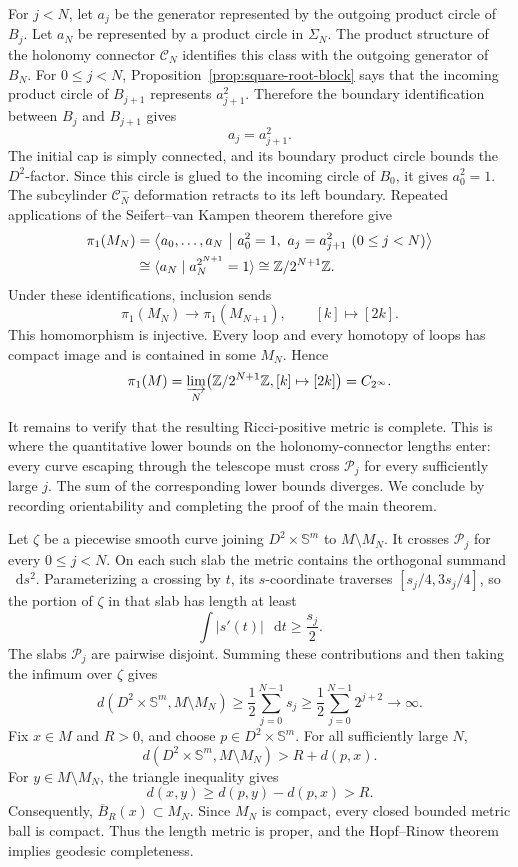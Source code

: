 \documentclass[11pt,reqno]{amsart}
\theoremstyle{definition}
\numberwithin{equation}{section}
\newcommand{\dd}{\mathop{}\!\mathrm d}
\newcommand{\CPrufer}{C_{2^\infty}}
\begin{document}
For \(j<N\), let \(a_j\) be the generator represented by the outgoing
product circle of \(B_j\).  Let \(a_N\) be represented by a product
circle in \(\Sigma_N\).  The product structure of the holonomy connector
\(\mathcal C_N\) identifies this
class with the outgoing generator of \(B_N\).
For \(0\le j<N\), Proposition~\ref{prop:square-root-block} says that
the incoming product circle of \(B_{j+1}\) represents \(a_{j+1}^2\).
Therefore the boundary identification between \(B_j\) and \(B_{j+1}\)
gives
\[
 a_j=a_{j+1}^2.
\]
The initial cap is simply connected, and its boundary product circle bounds
the \(D^2\)-factor.  Since this circle is glued to the incoming circle
of \(B_0\), it gives \(a_0^2=1\).  The subcylinder
$\mathcal C_N^-$ deformation retracts to its left boundary.  Repeated
 applications of the Seifert--van Kampen theorem therefore give
\begin{align}
 \pi_1(M_N)
 &=\left\langle a_0,\ldots,a_N\ \middle|\
   a_0^2=1,\ a_j=a_{j+1}^2\ (0\le j<N)\right\rangle\notag\\
 &\cong\langle a_N\mid a_N^{2^{N+1}}=1\rangle
 \cong\mathbb Z/2^{N+1}\mathbb Z.
 \label{eq:un-finite-pi1}
\end{align}
Under these identifications, inclusion sends
\[
 \pi_1(M_N)\longrightarrow\pi_1(M_{N+1}),
 \qquad [k]\longmapsto[2k].
\]
This homomorphism is injective.  Every loop and every homotopy of loops
has compact image and is contained in some \(M_N\).  Hence
\begin{equation}\label{eq:un-prufer}
 \pi_1(M)
 =\varinjlim_N\bigl(\mathbb Z/2^{N+1}\mathbb Z,[k]\mapsto[2k]\bigr)
 =\CPrufer.
\end{equation}

It remains to verify that the resulting Ricci-positive metric is
complete.  This is where the quantitative lower bounds on the
holonomy-connector lengths enter: every curve escaping through the
telescope must cross $\mathcal P_j$ for every sufficiently large $j$.
The sum of the corresponding lower bounds diverges.  We conclude by
recording orientability and completing the proof of the main theorem.

Let \(\zeta\) be a piecewise smooth curve joining
\(D^2\times\mathbb S^m\) to \(M\setminus M_N\).  It crosses
$\mathcal P_j$ for every $0\le j<N$.  On each such slab the metric
contains the orthogonal summand \(\dd s^2\).  Parameterizing a crossing
by \(t\), its \(s\)-coordinate traverses
\([s_j/4,3s_j/4]\), so the portion of \(\zeta\) in that slab has length
at least
\[
 \int|s'(t)|\,\dd t\ge\frac{s_j}{2}.
\]
The slabs $\mathcal P_j$ are pairwise disjoint.  Summing these contributions
and then taking the infimum over \(\zeta\) gives
\[
 d(D^2\times\mathbb S^m,M\setminus M_N)
 \ge\frac12\sum_{j=0}^{N-1}s_j
 \ge\frac12\sum_{j=0}^{N-1}2^{j+2}\longrightarrow\infty.
\]
Fix \(x\in M\) and \(R>0\), and choose
\(p\in D^2\times\mathbb S^m\).  For all sufficiently large \(N\),
\[
 d(D^2\times\mathbb S^m,M\setminus M_N)>R+d(p,x).
\]
For \(y\in M\setminus M_N\), the triangle inequality gives
\[
 d(x,y)\ge d(p,y)-d(p,x)>R.
\]
Consequently, \(\overline{B}_R(x)\subset M_N\).  Since \(M_N\) is
compact, every closed bounded metric ball is compact.  Thus the length
metric is proper, and the Hopf--Rinow theorem implies geodesic
completeness.
\end{document}
